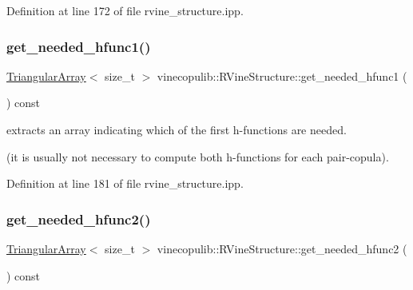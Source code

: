 Definition at line 172 of file rvine\+\_\+structure.\+ipp.

\mbox{\label{classvinecopulib_1_1_r_vine_structure_a71e339dae0c4ea4338c731a0dfa70780}} 
\subsubsection{\texorpdfstring{get\+\_\+needed\+\_\+hfunc1()}{get\_needed\_hfunc1()}}
{\footnotesize\ttfamily \hyperlink{classvinecopulib_1_1_triangular_array}{Triangular\+Array}$<$ size\+\_\+t $>$ vinecopulib\+::\+R\+Vine\+Structure\+::get\+\_\+needed\+\_\+hfunc1 (\begin{DoxyParamCaption}{ }\end{DoxyParamCaption}) const\hspace{0.3cm}{\ttfamily [inline]}}



extracts an array indicating which of the first h-\/functions are needed. 

(it is usually not necessary to compute both h-\/functions for each pair-\/copula). 

Definition at line 181 of file rvine\+\_\+structure.\+ipp.

\mbox{\label{classvinecopulib_1_1_r_vine_structure_aa935d78845713014d7aaf6a6aa1a9a8f}} 
\subsubsection{\texorpdfstring{get\+\_\+needed\+\_\+hfunc2()}{get\_needed\_hfunc2()}}
{\footnotesize\ttfamily \hyperlink{classvinecopulib_1_1_triangular_array}{Triangular\+Array}$<$ size\+\_\+t $>$ vinecopulib\+::\+R\+Vine\+Structure\+::get\+\_\+needed\+\_\+hfunc2 (\begin{DoxyParamCaption}{ }\end{DoxyParamCaption}) const\hspace{0.3cm}{\ttfamily [inline]}}



